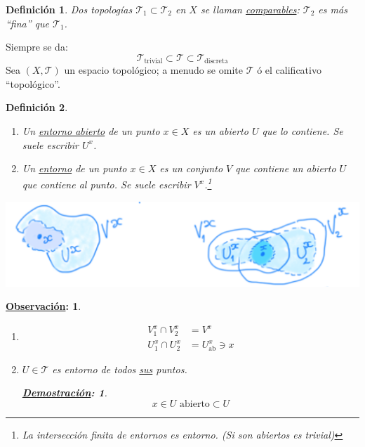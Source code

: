 \documentclass[10pt,a4paper,openright]{book}
\theoremstyle{break}
\newtheorem*{defi}{Definición}
\newtheorem*{demo}{\underline{Demostración}:}
\newtheorem*{obs}{\underline{Observación}:}
\begin{document}
\begin{defi}
Dos topologías $\mathcal{T}_1 \subset \mathcal{T}_2$ en $X$ se llaman \underline{comparables}: $\mathcal{T}_2$ es más ``fina'' que $\mathcal{T}_1$.
\end{defi}
Siempre se da:
\[
\mathcal{T}_{\text{trivial}} \subset \mathcal{T} \subset \mathcal{T}_{\text{discreta}} 
\]
Sea $\left( X, \mathcal{T} \right)$ un espacio topológico; a menudo se omite $\mathcal{T}$ ó el calificativo ``topológico''. 

\begin{defi}
\begin{enumerate}
    \item Un \underline{entorno abierto} de un punto $x \in X$ es un abierto $U$ que lo contiene. Se suele escribir $U^x$.
    \item Un \underline{entorno} de un punto $x \in X$ es un conjunto $V$ que contiene un abierto $U$ que contiene al punto. Se suele escribir $V^x$.\footnote{La intersección finita de entornos es entorno. (Si son abiertos es trivial)}
\end{enumerate}
\end{defi}
\begin{center}
    \includegraphics[scale=0.2]{images/def_entornos} 
\end{center}
\begin{obs}    
\begin{enumerate}
    \item \begin{align*}
        V_1^x \cap V_2^x &= V^x\\
        U_1^x \cap U_2^x &= U_{\text{ab}}^x \ni x
    \end{align*}

    \item $U \in \mathcal{T}$ es entorno de todos \underline{sus} puntos.
    \begin{demo}
    \[
    x \in U \text{ abierto} \subset U
    \]
    \end{demo}
\end{enumerate}
\end{obs}
\end{document}
